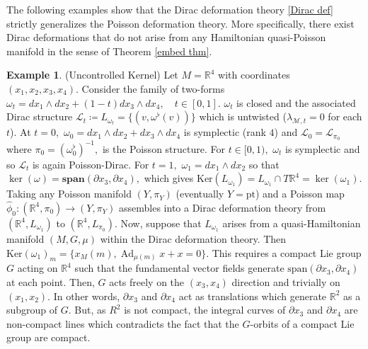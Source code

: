 \documentclass[reqno]{amsart}
\theoremstyle{plain}
\theoremstyle{definition}
\newtheorem{Exp}[Thm]{Example}
\newcommand{\R}{\mathbb{R}}
\newcommand{\too}{\longrightarrow}
\newcommand{\Ad}{\operatorname{Ad}}
\newcommand{\M}{\mathcal{M}}
\renewcommand{\L}{\mathcal{L}}
\newcommand{\Ker}{\text{Ker}}
\begin{document}
The following examples show that the Dirac deformation theory \ref{Dirac def} strictly generalizes the Poisson deformation theory. More specifically, there exist Dirac deformations that do not arise from any Hamiltonian quasi-Poisson manifold in the sense of Theorem \ref{embed thm}.

\begin{Exp}(Uncontrolled Kernel) \label{ex:UncontrolledKernel} 
Let $M = \R^{4}$ with coordinates $(x_1,x_2,x_3,x_4).$ Consider the family of two-forms $\omega_t = dx_1\wedge dx_2 + (1-t)dx_3 \wedge dx_4, \quad t\in [0,1].$ $\omega_t$ is closed and the associated Dirac structure $\L_t \coloneqq L_{\omega_t} = \{(v,\omega^{\flat}(v))\}$ which is untwisted ($\lambda_{\M,t} = 0$ for each $t$). At $t = 0,$ $\omega_0 = dx_1\wedge dx_2 + dx_3 \wedge dx_4$ is symplectic (rank $4$) and $\L_{0} = \L_{\pi_0}$ where $\pi_0 = (\omega_{0}^{\flat})^{-1},$ is the Poisson structure. For $t\in [0,1),$ $\omega_t$ is symplectic and so $\L_t$ is again Poisson-Dirac. For $t = 1,$ $\omega_1 = dx_1 \wedge dx_2$ so that $\ker(\omega) = \textbf{span}(\partial x_3, \partial x_4),$ which gives $\Ker(L_{\omega_1}) = L_{\omega_1}\cap T\R^{4} = \ker(\omega_1).$ Taking any Poisson manifold $(Y,\pi_Y)$ (eventually $Y = {\text{pt}}$) and a Poisson map $\widehat{\phi}_0: (\R^{4},\pi_0) \too (Y,\pi_Y)$ assembles into a Dirac deformation theory from $(\R^{4},L_{\omega_1})$ to $(\R^4, L_{{\pi}_0}).$ Now, suppose that $L_{\omega_1}$ arises from a quasi-Hamiltonian manifold $(M,G,\mu)$ within the Dirac deformation theory. Then $\Ker(\omega_1)_{m} = \{x_{M}(m), \Ad_{\mu(m)}x + x = 0\}.$ This requires a compact Lie group $G$ acting on $\R^4$ such that the fundamental vector fields generate $\text{span}(\partial x_3, \partial x_4)$ at each point. Then, $G$ acts freely on the $(x_3,x_4)$ direction and trivially on $(x_1,x_2).$ In other words, $\partial x_3$ and $\partial x_4$ act as translations which generate $\R^{2}$ as a subgroup of $G.$ But, as $R^{2}$ is not compact, the integral curves of $\partial x_3$ and $\partial x_4$ are non-compact lines which contradicts the fact that the $G$-orbits of a compact Lie group are compact.       
\end{Exp}
\end{document}

